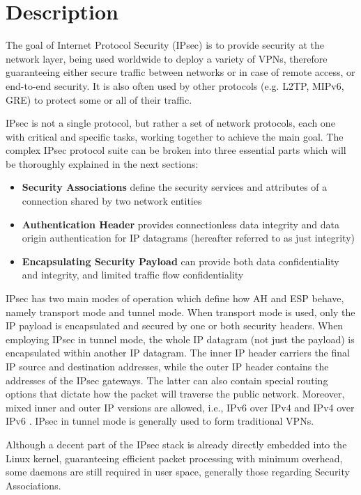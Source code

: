 \documentclass[a4paper,12pt]{report}
\begin{document}
	\section{Description }
		The goal of Internet Protocol Security (IPsec) is to provide security at the network layer, being used worldwide to deploy a variety of VPNs, therefore guaranteeing either secure traffic between networks or in case of remote access, or end-to-end security. It is also often used by other protocols (e.g. L2TP, MIPv6, GRE) to protect some or all of their traffic.
		
		IPsec is not a single protocol, but rather a set of network protocols, each one with critical and specific tasks, working together to achieve the main goal. The complex IPsec protocol suite can be broken into three essential parts which will be thoroughly explained in the next sections:
		\begin{itemize}
			\item \textbf{Security Associations} define the security services and attributes of a connection shared by two network entities
			\item \textbf{Authentication Header} provides connectionless data integrity and data origin authentication for IP datagrams (hereafter referred to as just integrity) \cite{rfc4302}
			\item \textbf{Encapsulating Security Payload} can provide both data confidentiality and integrity, and limited traffic flow confidentiality \cite{rfc2406}
		\end{itemize}
		
		IPsec has two main modes of operation which define how AH and ESP behave, namely transport mode and tunnel mode. When transport mode is used, only the IP payload is encapsulated and secured by one or both security headers. When employing IPsec in tunnel mode, the whole IP datagram (not just the payload) is encapsulated within another IP datagram. The inner IP header carriers the final IP source and destination addresses, while the outer IP header contains the addresses of the IPsec gateways. The latter can also contain special routing options that dictate how the packet will traverse the public network. Moreover, mixed inner and outer IP versions are allowed, i.e., IPv6 over IPv4 and IPv4 over IPv6 \cite{rfc4302}. IPsec in tunnel mode is generally used to form traditional VPNs.
		
		Although a decent part of the IPsec stack is already directly embedded into the Linux kernel, guaranteeing efficient packet processing with minimum overhead, some daemons are still required in user space, generally those regarding Security Associations.
		
\end{document}
